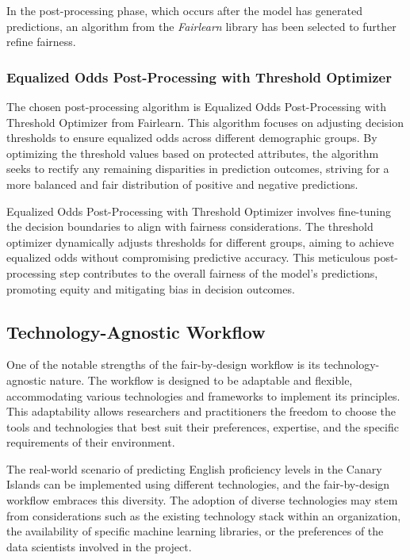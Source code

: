 In the post-processing phase, which occurs after the model has generated predictions, an algorithm from the \emph{Fairlearn} library has been selected to further refine fairness.

\subsubsection{Equalized Odds Post-Processing with Threshold Optimizer}

The chosen post-processing algorithm is Equalized Odds Post-Processing with Threshold Optimizer from Fairlearn. This algorithm focuses on adjusting decision thresholds to ensure equalized odds across different demographic groups. By optimizing the threshold values based on protected attributes, the algorithm seeks to rectify any remaining disparities in prediction outcomes, striving for a more balanced and fair distribution of positive and negative predictions. \cite{10.5555/3157382.3157469}

Equalized Odds Post-Processing with Threshold Optimizer involves fine-tuning the decision boundaries to align with fairness considerations. The threshold optimizer dynamically adjusts thresholds for different groups, aiming to achieve equalized odds without compromising predictive accuracy. This meticulous post-processing step contributes to the overall fairness of the model's predictions, promoting equity and mitigating bias in decision outcomes. 

\subsection{Technology-Agnostic Workflow}

One of the notable strengths of the fair-by-design workflow is its technology-agnostic nature. The workflow is designed to be adaptable and flexible, accommodating various technologies and frameworks to implement its principles. This adaptability allows researchers and practitioners the freedom to choose the tools and technologies that best suit their preferences, expertise, and the specific requirements of their environment.

The real-world scenario of predicting English proficiency levels in the Canary Islands can be implemented using different technologies, and the fair-by-design workflow embraces this diversity. The adoption of diverse technologies may stem from considerations such as the existing technology stack within an organization, the availability of specific machine learning libraries, or the preferences of the data scientists involved in the project.

